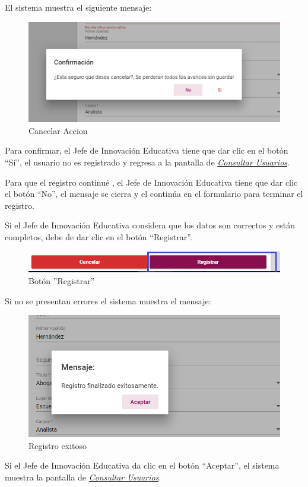 El sistema muestra el siguiente mensaje:


\begin{figure}[H]
	\centering
	\includegraphics[width=0.4\linewidth]{images/SP5/MSG29}
	\caption{Cancelar Accion}
	\label{mensaje29-JIE}
\end{figure}

Para confirmar, el Jefe de Innovación Educativa tiene que dar clic en el botón “Sí”, el usuario no es registrado y regresa a la pantalla de \hyperlink{consultarUs-JIE}{\textit{Consultar Usuarios}}.

Para que el registro continué , el Jefe de Innovación Educativa tiene que  dar clic el botón “No”, el mensaje se  cierra  y el continúa en el formulario para terminar el registro.

Si el Jefe de Innovación Educativa considera que los datos son correctos y están completos, debe de dar clic en el botón “Registrar”.

\begin{figure}[H]
	\centering
	\hypertarget{btnreg-JIE}{\includegraphics[width=0.7\linewidth]{images/SP5/BtnRegistrar}}
	\caption{Botón ''Registrar''}
	\label{btnreg-JIE}
\end{figure}

Si no se presentan errores el sistema muestra el mensaje:


\begin{figure}[H]
	\centering
	\includegraphics[width=0.4\linewidth]{images/SP5/MSG5}
	\caption{Registro exitoso}
	\label{mensaje5-JIE}

\end{figure}

Si el Jefe de Innovación Educativa  da clic en el botón “Aceptar”, el sistema muestra la pantalla de  \hyperlink{consultarUs-JIE}{\textit{Consultar Usuarios}}.


